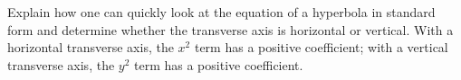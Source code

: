 {Explain how one can quickly look at the equation of a hyperbola in standard form and determine whether the transverse axis is horizontal or vertical.
}
{With a horizontal transverse axis, the $x^2$ term has a positive coefficient; with a vertical transverse axis, the $y^2$ term has a positive coefficient.
}
